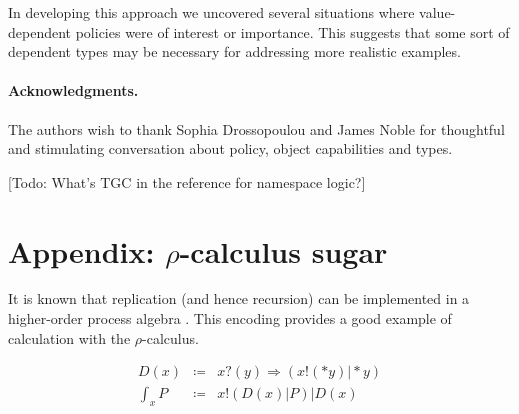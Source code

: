 \documentclass[]{amsart}
\newcommand{\lpquote}{\ulcorner}
\newcommand{\rpquote}{\urcorner}
\newcommand{\id}[1]{\texttt{#1}}
\newcommand{\juxtap}{\mathbin{\id{|}}}
\newcommand{\concat}{\Rightarrow}
\newcommand{\binpar}[2]{#1 \juxtap #2}
\newcommand{\outputp}[2]{#1 ! ( * #2 )}
\newcommand{\prefix}[3]{#1 ? ( #2 ) \concat #3}
\newcommand{\lift}[2]{#1 ! ( #2 )}
\newcommand{\dropn}[1]{*#1}
\newcommand{\xbangp}[2]{\int_{#2} #1}
\newcommand{\defneqls}{\coloneqq}
\theoremstyle{definition}
\theoremstyle{remark}
\numberwithin{equation}{subsection}
\newcommand{\rhoc}{$\rho$-calculus}
\begin{document}
In developing this approach we uncovered several situations where
value-dependent policies were of interest or importance. This suggests
that some sort of dependent types may be necessary for addressing more
realistic examples.

\paragraph{Acknowledgments.}
The authors wish to thank Sophia Drossopoulou and James Noble for
thoughtful and stimulating conversation about policy, object
capabilities and types.




[Todo: What's TGC in the reference for namespace logic?]


\section{Appendix: $\rho$-calculus sugar}

It is known that replication (and hence recursion) can be implemented
in a higher-order process algebra \cite{SangiorgiWalker}. This
encoding provides a good example of calculation with the {\rhoc}.


\begin{eqnarray*}
	D(x) & \defneqls & \prefix{x}{y}{(\binpar{\outputp{x}{y}}{\dropn{y}})} \\
	\xbangp{P}{x} & \defneqls & \binpar{\lift{x}{\binpar{D(x)}{P}}}{D(x)}
\end{eqnarray*}
\end{document}
